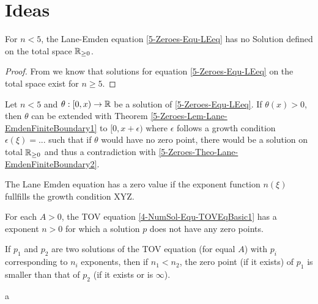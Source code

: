 \section{Ideas}

%
%
%
\begin{theorem}
	\label{5-Zeroes-Theo-Lane-EmdenFiniteBoundary2}
	For $n<5$, the Lane-Emden equation \ref{5-Zeroes-Equ-LEeq} has no Solution defined on the total space $\mathbb{R}_{\geq0}$.
\end{theorem}
\begin{proof}
	From \cite{quittnerSuperlinearParabolicProblems2007a} we know that solutions for equation \ref{5-Zeroes-Equ-LEeq} on the total space exist for $n\geq5$.
	
\end{proof}
%
%
%
\begin{theorem}
	\label{5-Zeroes-Theo-Lane-EmdenFiniteBoundary3}
	Let $n<5$ and $\theta:[0,x)\rightarrow\mathbb{R}$ be a solution of \ref{5-Zeroes-Equ-LEeq}. If $\theta(x)>0$, then $\theta$ can be extended with Theorem \ref{5-Zeroes-Lem-Lane-EmdenFiniteBoundary1} 
	to $[0,x+\epsilon)$ where $\epsilon$ follows a growth condition $\epsilon(\xi)=...$ such that if $\theta$ would have no zero point, there would be a solution on total 
	$\mathbb{R}_{\geq0}$ and thus a contradiction with \ref{5-Zeroes-Theo-Lane-EmdenFiniteBoundary2}.
\end{theorem}
\begin{theorem}
	The Lane Emden equation has a zero value if the exponent function $n(\xi)$ fullfills the growth condition XYZ.
\end{theorem}


\begin{theorem}
	For each $A>0$, the TOV equation \ref{4-NumSol-Equ-TOVEqBasic1} has a exponent $n>0$ for which a solution $p$ does not have any zero points.
\end{theorem}
\begin{theorem}
	If $p_1$ and $p_2$ are two solutions of the TOV equation (for equal $A$) with $p_i$ corresponding to $n_i$ exponents, then if $n_1<n_2$, the zero 
	point (if it exists) of $p_1$ is smaller than that of $p_2$ (if it exists or is $\infty$).
\end{theorem}
\begin{theorem}
	a 
\end{theorem}




